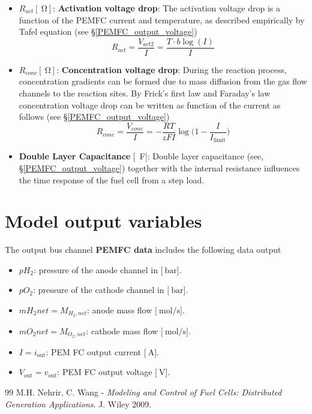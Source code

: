 \documentclass[12pt,a4paper]{scrartcl}
\begin{document}
\begin{onehalfspace}
\begin{itemize}
\begin{equation*}
\begin{aligned}
			&	R_{ohm} = R_{ohm,0} + k_{RI}I - k_{RT}T \\[8pt]
		\end{aligned} 
	\end{equation*}
	\item[$-$] $R_{act}[\SI{}{\ohm}]$: \textbf{Activation voltage drop}: The activation voltage drop is a function of the PEMFC current and temperature, as described empirically by Tafel equation (see §\ref{PEMFC_output_voltage})
	\begin{equation*}
		R_{act}=\frac{V_{act2}}{I} = \frac{T\cdot b\log(I)}{I}
	\end{equation*}
	
	\item[$-$] $R_{conc}[\SI{}{\ohm}]$: \textbf{Concentration voltage drop}: During the reaction process, concentration  gradients can be formed due to mass diffusion from the gas flow channels to the reaction sites. By Frick's first law and Faraday's law concentration voltage drop can be written as function of the current as follows (see §\ref{PEMFC_output_voltage})
	\begin{equation}
		R_{conc}=\frac{V_{conc}}{I}=-\frac{RT}{zFI}\log\Big(1-\frac{I}{I_{\text{limit}}}\Big)
	\end{equation} 
	\item[$-$] \textbf{Double Layer Capacitance} [\SI{}{\farad}]: Double layer capacitance (see, §\ref{PEMFC_output_voltage}) together with the internal resistance influences the time response of the fuel cell from a step load.
\end{itemize}

\section{Model output variables}
The output bus channel \textbf{PEMFC data} includes the following data output
\begin{itemize}
	\item[$-$] $pH_2$: pressure of the anode channel in $\Big[\SI{}{\bar}\Big]$.
	\item[$-$] $pO_2$: pressure of the cathode channel in $\Big[\SI{}{\bar}\Big]$.
	\item[$-$] $mH_2net=M_{H_2,net}$: anode mass flow $\Big[\SI{}{\mol\per\second}\Big]$.
	\item[$-$] $mO_2net=M_{O_2,net}$: cathode mass flow $\Big[\SI{}{\mol\per\second}\Big]$.
	\item[$-$] $I = i_\text{out}$: PEM FC output current $\Big[\SI{}{\ampere}\Big]$.
	\item[$-$] $V_\text{out} = v_\text{out}$: PEM FC output voltage $\Big[\SI{}{\volt}\Big]$.
\end{itemize}

\begin{thebibliography}{99}
	 M.H. Nehrir, C. Wang - \textit{Modeling and Control of Fuel Cells: Distributed Generation Applications}. J. Wiley 2009.
	
\end{thebibliography}
\end{onehalfspace}
\end{document}
